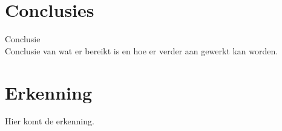 \documentclass{article}
\begin{document}
\section{Conclusies}
Conclusie\cite{sortingNetworksSize2014}\\
Conclusie van wat er bereikt is en hoe er verder aan gewerkt kan worden.

\section*{Erkenning}
Hier komt de erkenning.





\end{document}
